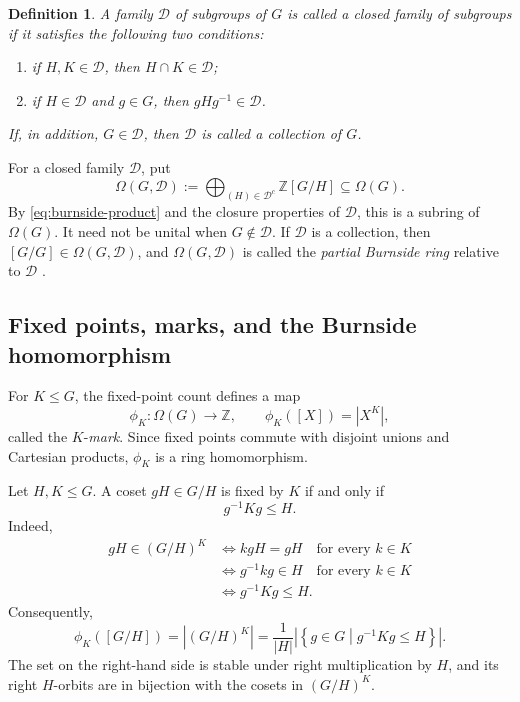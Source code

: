 \documentclass[a4paper,11pt]{article}
\numberwithin{equation}{section}
\newtheorem{definition}[theorem]{Definition}
\newcommand{\Z}{\mathbb{Z}}
\begin{document}
\begin{definition}\label{def:closed-family}
A family $\mathcal D$ of subgroups of $G$ is called a \emph{closed family of subgroups}
if it satisfies the following two conditions:
\begin{enumerate}[label=\textup{(\roman*)},leftmargin=3em]
\item if $H,K\in\mathcal D$, then $H\cap K\in\mathcal D$;
\item if $H\in\mathcal D$ and $g\in G$, then $gHg^{-1}\in\mathcal D$.
\end{enumerate}
If, in addition, $G\in\mathcal D$, then $\mathcal D$ is called a \emph{collection} of $G$.
\end{definition}

For a closed family $\mathcal D$, put
\begin{equation}\label{eq:partial-burnside}
  \Omega(G,\mathcal D)
  :=\bigoplus_{(H)\in\mathcal D^c}\Z[G/H]
  \subseteq\Omega(G).
\end{equation}
By \eqref{eq:burnside-product} and the closure properties of $\mathcal D$, this is a
subring of $\Omega(G)$. It need not be unital when $G\notin\mathcal D$. If $\mathcal D$
is a collection, then $[G/G]\in\Omega(G,\mathcal D)$, and $\Omega(G,\mathcal D)$ is
called the \emph{partial Burnside ring} relative to $\mathcal D$
\cite{YoshidaGeneralized,IdeiOda,OdaTakegaharaYoshida}.

\subsection{Fixed points, marks, and the Burnside homomorphism}
\label{subsec:marks}

For $K\le G$, the fixed-point count defines a map
\begin{equation}\label{eq:mark-general}
  \phi_K:\Omega(G)\longrightarrow\Z,
  \qquad \phi_K([X])=|X^K|,
\end{equation}
called the $K$-\emph{mark}. Since fixed points commute with disjoint unions and
Cartesian products, $\phi_K$ is a ring homomorphism.

Let $H,K\le G$. A coset $gH\in G/H$ is fixed by $K$ if and only if
\[
  g^{-1}Kg\le H.
\]
Indeed,
\[
\begin{aligned}
  gH\in(G/H)^K
  &\Longleftrightarrow
  kgH=gH
  \quad\text{for every }k\in K\\
  &\Longleftrightarrow
  g^{-1}kg\in H
  \quad\text{for every }k\in K\\
  &\Longleftrightarrow
  g^{-1}Kg\le H.
\end{aligned}
\]
Consequently,
\begin{equation}\label{eq:fixed-coset-formula}
  \phi_K([G/H])
  =
  |(G/H)^K|
  =
  \frac{1}{|H|}
  \left|
    \left\{
      g\in G
      \mathrel{}\middle|\mathrel{}
      g^{-1}Kg\le H
    \right\}
  \right|.
\end{equation}
The set on the right-hand side is stable under right multiplication by $H$,
and its right $H$-orbits are in bijection with the cosets in $(G/H)^K$.
\end{document}
